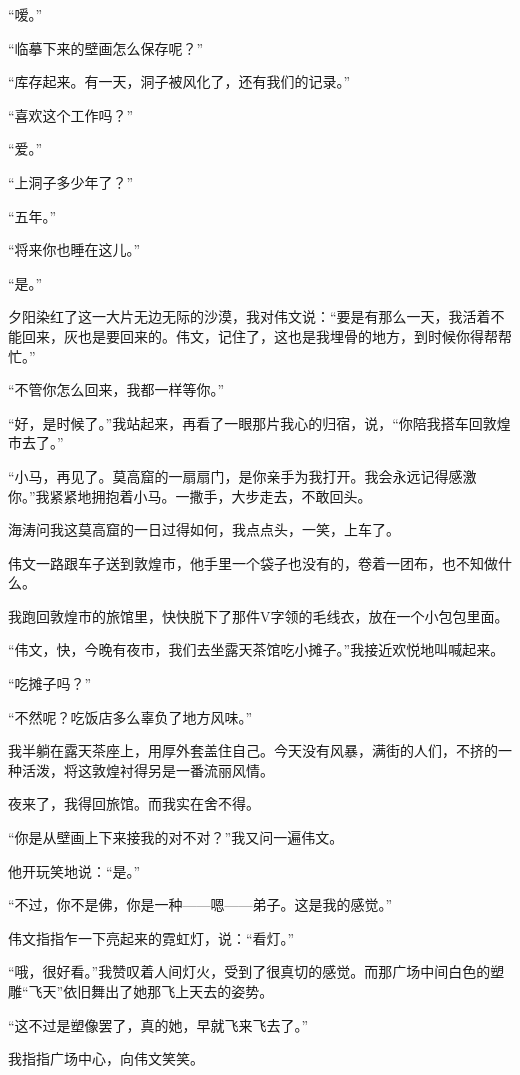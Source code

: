 \par “嗳。”
\par “临摹下来的壁画怎么保存呢？”
\par “库存起来。有一天，洞子被风化了，还有我们的记录。”
\par “喜欢这个工作吗？”
\par “爱。”
\par “上洞子多少年了？”
\par “五年。”
\par “将来你也睡在这儿。”
\par “是。”
\par 夕阳染红了这一大片无边无际的沙漠，我对伟文说：“要是有那么一天，我活着不能回来，灰也是要回来的。伟文，记住了，这也是我埋骨的地方，到时候你得帮帮忙。”
\par “不管你怎么回来，我都一样等你。”
\par “好，是时候了。”我站起来，再看了一眼那片我心的归宿，说，“你陪我搭车回敦煌市去了。”
\par “小马，再见了。莫高窟的一扇扇门，是你亲手为我打开。我会永远记得感激你。”我紧紧地拥抱着小马。一撒手，大步走去，不敢回头。
\par 海涛问我这莫高窟的一日过得如何，我点点头，一笑，上车了。
\par 伟文一路跟车子送到敦煌市，他手里一个袋子也没有的，卷着一团布，也不知做什么。
\par 我跑回敦煌市的旅馆里，快快脱下了那件V字领的毛线衣，放在一个小包包里面。
\par “伟文，快，今晚有夜市，我们去坐露天茶馆吃小摊子。”我接近欢悦地叫喊起来。
\par “吃摊子吗？”
\par “不然呢？吃饭店多么辜负了地方风味。”
\par 我半躺在露天茶座上，用厚外套盖住自己。今天没有风暴，满街的人们，不挤的一种活泼，将这敦煌衬得另是一番流丽风情。
\par 夜来了，我得回旅馆。而我实在舍不得。
\par “你是从壁画上下来接我的对不对？”我又问一遍伟文。
\par 他开玩笑地说：“是。”
\par “不过，你不是佛，你是一种——嗯——弟子。这是我的感觉。”
\par 伟文指指乍一下亮起来的霓虹灯，说：“看灯。”
\par “哦，很好看。”我赞叹着人间灯火，受到了很真切的感觉。而那广场中间白色的塑雕“飞天”依旧舞出了她那飞上天去的姿势。
\par “这不过是塑像罢了，真的她，早就飞来飞去了。”
\par 我指指广场中心，向伟文笑笑。
